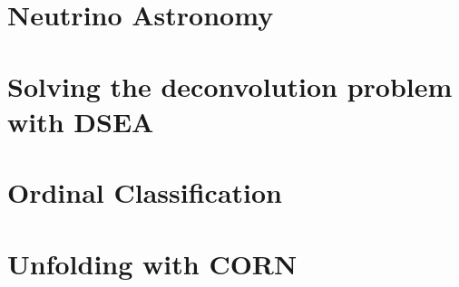 
\chapter{Neutrino Astronomy} \label{sec:neutrino_astronomy}
  
  
  
\chapter{Solving the deconvolution problem with DSEA} \label{sec:dsea}
  
  
  
\chapter{Ordinal Classification} \label{sec:ordinal}
  
  
  
\chapter{Unfolding with CORN} \label{sec:unfolding}
  
  
  
  
  
  

